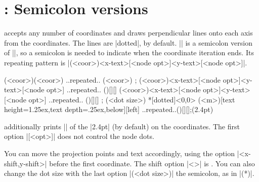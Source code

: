 \section{\protect\cmd{\tzprojs(*)}: Semicolon versions}
\label{s:tzprojs}

\icmd{\tzprojs} accepts any number of coordinates and draws perpendicular lines onto each axis from the coordinates. The lines are |dotted|, by default.
|\tzprojs| is a semicolon version of |\tzproj|, so a semicolon is needed to indicate when the coordinate iteration ends. Its repeating pattern is |(<coor>){<x-text>}[<node opt>]{<y-text>}[<node opt>]|. 

\begin{tzdef}
\tzprojs(<coor>)(<coor>) ..repeated.. (<coor>) ;
\tzprojs*(<coor>){<x-text>}[<node opt>]{<y-text>}[<node opt>]
         ..repeated.. (){}[]{}[]
         (<coor>){<x-text>}[<node opt>]{<y-text>}[<node opt>]
         ..repeated.. (){}[]{}[] ; (<dot size>)
 *[dotted]<0,0>
  (<m>){}[text height=1.25ex,text depth=.25ex,below]{}[left]
  ..repeated..(){}[]{}[];(2.4pt)
\end{tzdef}

\icmd{\tzprojs*} additionally prints |\tzdots*| of the |2.4pt| (by default) on the coordinates.
The first option |[<opt>]| does not control the node dots.

\begin{tzcode}{.3}
\end{tzcode}

You can move the projection points and text accordingly, using the option |<x-shift,y-shift>| before the first coordinate. The  shift option |<>| is .
You can also change the dot size with the last option |(<dot size>)|  the semicolon, as in |\tzproj(*)|.

\begin{tzcode}{.3}
\end{tzcode}



